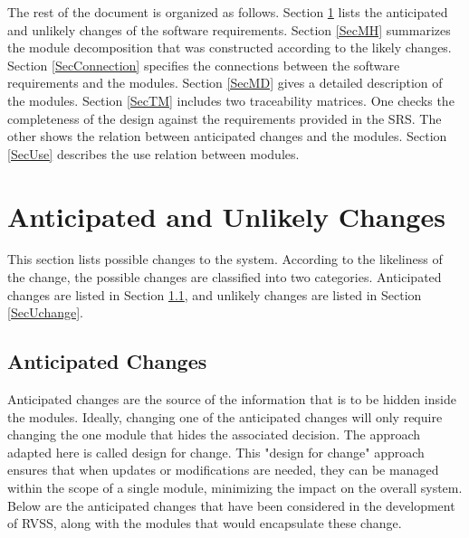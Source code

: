 \documentclass[12pt, titlepage]{article}
\begin{document}
The rest of the document is organized as follows. Section \ref{SecChange} lists the anticipated and unlikely changes of the software requirements. Section \ref{SecMH} summarizes the module decomposition that was constructed according to the likely changes. Section \ref{SecConnection} specifies the connections between the software requirements and the
modules. Section \ref{SecMD} gives a detailed description of the modules. Section \ref{SecTM} includes two traceability matrices. One checks the completeness of the design against the requirements provided in the SRS. The other shows the relation between anticipated changes and the modules. Section \ref{SecUse} describes the use relation between modules.

\section{Anticipated and Unlikely Changes} \label{SecChange}

This section lists possible changes to the system. According to the likeliness of the change, the possible changes are classified into two categories. Anticipated changes are listed in Section \ref{SecAchange}, and unlikely changes are listed in Section \ref{SecUchange}.

\subsection{Anticipated Changes} \label{SecAchange}

Anticipated changes are the source of the information that is to be hidden inside the modules. Ideally, changing one of the anticipated changes will only require changing the one module that hides the associated decision. The approach
adapted here is called design for change. This "design for change" approach ensures that when updates or modifications are needed, they can be managed within the scope of a single module, minimizing the impact on the overall system. Below are the anticipated changes that have been considered in the development of RVSS, along with the modules that would encapsulate these change.
\end{document}
